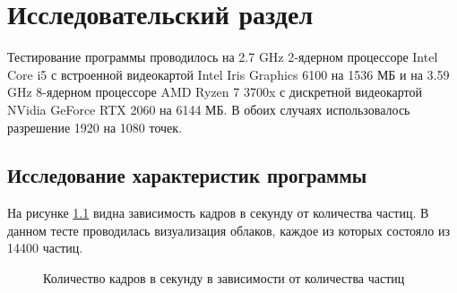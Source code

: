 \chapter{Исследовательский раздел}
\label{cha:research}

Тестирование программы проводилось на 2.7 GHz 2‑ядерном процессоре Intel Core i5 с встроенной видеокартой
Intel Iris Graphics 6100 на 1536 МБ и на 3.59 GHz 8-ядерном процессоре AMD Ryzen 7 3700x с дискретной
видеокартой NVidia GeForce RTX 2060 на 6144 МБ. В обоих случаях использовалось разрешение 1920 на 1080
точек.

\section{Исследование характеристик программы}

На рисунке \ref{img:plot} видна зависимость кадров в секунду от количества частиц.
В данном тесте проводилась визуализация облаков, каждое из которых состояло из 14400 частиц.

\begin{figure}[H]
    \caption{Количество кадров в секунду в зависимости от количества частиц}
    \label{img:plot}
\end{figure}

